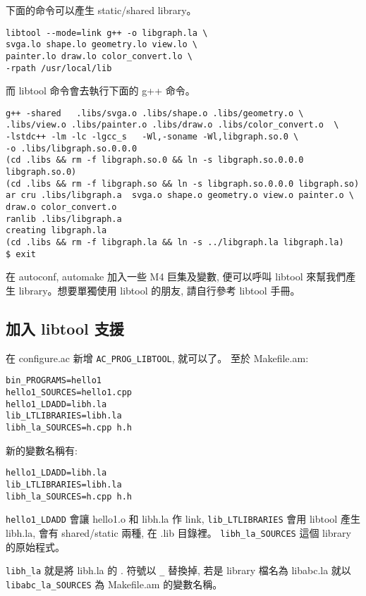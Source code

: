 \documentclass[12pt,a4]{article}
\begin{document}
\begin{CJK}{UTF8}{bsmi}
下面的命令可以產生 static/shared library。
\begin{verbatim}
libtool --mode=link g++ -o libgraph.la \
svga.lo shape.lo geometry.lo view.lo \
painter.lo draw.lo color_convert.lo \
-rpath /usr/local/lib
\end{verbatim}

而 libtool 命令會去執行下面的 g++ 命令。

\begin{verbatim}
g++ -shared   .libs/svga.o .libs/shape.o .libs/geometry.o \
.libs/view.o .libs/painter.o .libs/draw.o .libs/color_convert.o  \
-lstdc++ -lm -lc -lgcc_s   -Wl,-soname -Wl,libgraph.so.0 \
-o .libs/libgraph.so.0.0.0
(cd .libs && rm -f libgraph.so.0 && ln -s libgraph.so.0.0.0 libgraph.so.0)
(cd .libs && rm -f libgraph.so && ln -s libgraph.so.0.0.0 libgraph.so)
ar cru .libs/libgraph.a  svga.o shape.o geometry.o view.o painter.o \
draw.o color_convert.o
ranlib .libs/libgraph.a
creating libgraph.la
(cd .libs && rm -f libgraph.la && ln -s ../libgraph.la libgraph.la)
$ exit
\end{verbatim}

在 autoconf, automake 加入一些 M4 巨集及變數, 便可以呼叫 libtool 來幫我們產生
library。想要單獨使用 libtool 的朋友, 請自行參考 libtool 手冊。 

\subsection{加入 libtool 支援}
在 configure.ac 新增 \verb+AC_PROG_LIBTOOL+, 就可以了。
至於 Makefile.am:

\begin{verbatim}
bin_PROGRAMS=hello1
hello1_SOURCES=hello1.cpp
hello1_LDADD=libh.la
lib_LTLIBRARIES=libh.la
libh_la_SOURCES=h.cpp h.h
\end{verbatim}

新的變數名稱有:
\begin{verbatim}
hello1_LDADD=libh.la
lib_LTLIBRARIES=libh.la
libh_la_SOURCES=h.cpp h.h
\end{verbatim}

\verb+hello1_LDADD+ 會讓 hello1.o 和 libh.la 作 link,
\verb+lib_LTLIBRARIES+ 會用 libtool 產生 libh.la, 會有 shared/static 兩種,
在 .lib 目錄裡。
\verb+libh_la_SOURCES+ 這個 library 的原始程式。

\verb+libh_la+ 就是將 libh.la 的 . 符號以 \verb+_+ 替換掉,
若是 library 檔名為 libabc.la 就以 \verb+libabc_la_SOURCES+ 為 Makefile.am 的變數名稱。




\end{CJK}
\end{document}

